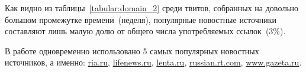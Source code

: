         Как видно из таблицы~\ref{tabular:domain_2} среди твитов, собранных на довольно большом промежутке времени~(неделя), популярные новостные источники
        составляют лишь малую долю от общего числа употребляемых ссылок~(3\%).

        В работе одновременно использовано 5 самых популярных новостных источников, а именно: \url{ria.ru},
        \url{lifenews.ru}, \url{lenta.ru}, \url{russian.rt.com}, \url{www.gazeta.ru}.


        \clearpage


